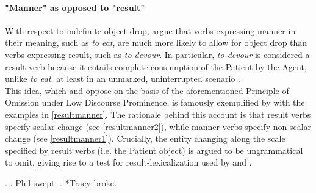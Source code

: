 \paragraph{"Manner" as opposed to "result"} 
With respect to indefinite object drop, \textcite{RappaportLevin1998building, RappaportHovavLevin2005, LevinRappaportHovav2008, RappaportHovavLevin2010} argue that verbs expressing manner in their meaning, such as \textit{to eat}, are much more likely to allow for object drop than verbs expressing result, such as \textit{to devour}. In particular, \textit{to devour} is considered a result verb because it entails complete consumption of the Patient by the Agent, unlike \textit{to eat}, at least in an unmarked, uninterrupted scenario \parencite{Melchin2019, smollett2005quantized, pinon2008aspectual}.\\
This idea, which \textcite{Goldberg2001} and \textcite{Onozuka2007} oppose on the basis of the aforementioned Principle of Omission under Low Discourse Prominence, is famously exemplified by \textcite{RappaportLevin1998building} with the examples in \ref{resultmanner}. The rationale behind this account is that result verbs specify scalar change (see \ref{resultmanner2}), while manner verbs specify non-scalar change (see \ref{resultmanner1}). Crucially, the entity changing along the scale specified by result verbs (i.e. the Patient object) is argued to be ungrammatical to omit, giving rise to a test for result-lexicalization used by \textcite{BeaversKoontzGarboden2012} and \textcite{Rissman2016}.

\ex. \label{resultmanner} \a. \label{resultmanner1} Phil swept.
\b. \label{resultmanner2} *Tracy broke.

